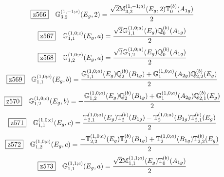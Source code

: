 \documentclass[fleqn,10pt,landscape]{jsarticle}
\begin{document}
\begin{dmath*}
\hspace*{3mm}\fbox{z566}\quad \mathbb{G}_{3,2}^{(1,-1;c)}(E_{g},2)=\frac{\sqrt{2} \mathbb{M}_{3,2}^{(1,-1;a)}(E_{g},2) \mathbb{T}_{0}^{(b)}(A_{1g})}{2}
\end{dmath*}
\begin{dmath*}
\hspace*{3mm}\fbox{z567}\quad \mathbb{G}_{1,1}^{(1,0;c)}(E_{g},a)=\frac{\sqrt{2} \mathbb{G}_{1,1}^{(1,0;a)}(E_{g}) \mathbb{Q}_{0}^{(b)}(A_{1g})}{2}
\end{dmath*}
\begin{dmath*}
\hspace*{3mm}\fbox{z568}\quad \mathbb{G}_{1,2}^{(1,0;c)}(E_{g},a)=\frac{\sqrt{2} \mathbb{G}_{1,2}^{(1,0;a)}(E_{g}) \mathbb{Q}_{0}^{(b)}(A_{1g})}{2}
\end{dmath*}
\begin{dmath*}
\hspace*{3mm}\fbox{z569}\quad \mathbb{G}_{1,1}^{(1,0;c)}(E_{g},b)=\frac{\mathbb{G}_{1,1}^{(1,0;a)}(E_{g}) \mathbb{Q}_{2}^{(b)}(B_{1g}) + \mathbb{G}_{1}^{(1,0;a)}(A_{2g}) \mathbb{Q}_{2,2}^{(b)}(E_{g})}{2}
\end{dmath*}
\begin{dmath*}
\hspace*{3mm}\fbox{z570}\quad \mathbb{G}_{1,2}^{(1,0;c)}(E_{g},b)=- \frac{\mathbb{G}_{1,2}^{(1,0;a)}(E_{g}) \mathbb{Q}_{2}^{(b)}(B_{1g}) + \mathbb{G}_{1}^{(1,0;a)}(A_{2g}) \mathbb{Q}_{2,1}^{(b)}(E_{g})}{2}
\end{dmath*}
\begin{dmath*}
\hspace*{3mm}\fbox{z571}\quad \mathbb{G}_{1,1}^{(1,0;c)}(E_{g},c)=\frac{\mathbb{T}_{2,1}^{(1,0;a)}(E_{g}) \mathbb{T}_{2}^{(b)}(B_{1g}) - \mathbb{T}_{2}^{(1,0;a)}(B_{1g}) \mathbb{T}_{2,1}^{(b)}(E_{g})}{2}
\end{dmath*}
\begin{dmath*}
\hspace*{3mm}\fbox{z572}\quad \mathbb{G}_{1,2}^{(1,0;c)}(E_{g},c)=\frac{- \mathbb{T}_{2,2}^{(1,0;a)}(E_{g}) \mathbb{T}_{2}^{(b)}(B_{1g}) + \mathbb{T}_{2}^{(1,0;a)}(B_{1g}) \mathbb{T}_{2,2}^{(b)}(E_{g})}{2}
\end{dmath*}
\begin{dmath*}
\hspace*{3mm}\fbox{z573}\quad \mathbb{G}_{1,1}^{(1,1;c)}(E_{g},a)=\frac{\sqrt{2} \mathbb{M}_{1,1}^{(1,1;a)}(E_{g}) \mathbb{T}_{0}^{(b)}(A_{1g})}{2}
\end{dmath*}
\end{document}
